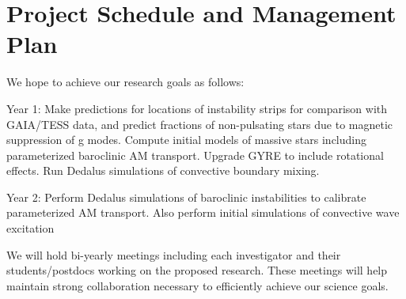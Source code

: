 \section{Project Schedule and Management Plan}

We hope to achieve our research goals as follows:

Year 1: Make predictions for locations of instability strips for comparison with GAIA/TESS data, and predict fractions of non-pulsating stars due to magnetic suppression of g modes. Compute initial models of massive stars including parameterized baroclinic AM transport. Upgrade GYRE to include rotational effects. Run Dedalus simulations of convective boundary mixing.

Year 2: Perform Dedalus simulations of baroclinic instabilities to calibrate parameterized AM transport. Also perform initial simulations of convective wave excitation

We will  hold bi-yearly meetings including each investigator and their students/postdocs working on the proposed research. These meetings will help maintain strong collaboration necessary to efficiently achieve our science goals.
